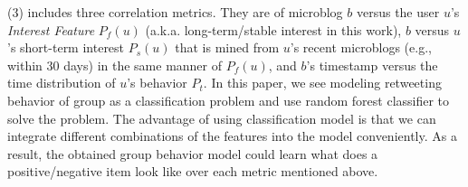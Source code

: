 	\stab(3)  includes three correlation metrics. They are of microblog $b$ versus the user $u$'s \textit{Interest Feature} $P_f(u)$ (a.k.a. long-term/stable interest in this work), $b$ versus $u$'s short-term interest $P_s(u)$ that is mined from $u$'s recent microblogs (e.g., within 30 days) in the same manner of $P_f(u)$, and $b$'s timestamp versus the time distribution of $u$'s \retg{} behavior $P_t$.
In this paper, we see modeling retweeting behavior of group as a classification problem and use random forest classifier to solve the problem. The advantage of using classification model is that we can integrate different combinations of the features into the model conveniently. As a result, the obtained group behavior model could learn what does a positive/negative item look like over each metric mentioned above.\par











